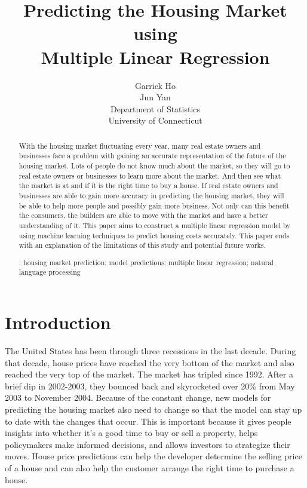 \documentclass[12pt]{article}
\title{Predicting the Housing Market using \\  Multiple Linear Regression}
\author{Garrick Ho\\
  Jun Yan\\[1ex]
  Department of Statistics\\
  University of Connecticut\\
}
\begin{document}
\maketitle
\doublespace

\begin{abstract}
With the housing market fluctuating every year, many real estate owners and businesses face a problem with gaining an accurate representation of the future of the housing market. Lots of people do not know much about the market, so they will go to real estate owners or businesses to learn more about the market. And then see what the market is at and if it is the right time to buy a house. If real estate owners and businesses are able to gain more accuracy in predicting the housing market, they will be able to help more people and possibly gain more business. Not only can this benefit the consumers, the builders are able to move with the market and have a better understanding of it. This paper aims to construct a multiple linear regression model by using machine learning techniques to predict housing costs accurately. This paper ends with an explanation of the limitations of this study and potential future works.

\bigskip
{}:
housing market prediction;
model predictions;
multiple linear regression;
natural language processing


\end{abstract}

\section{Introduction}
\label{sec:intro}


The United States has been through three recessions in the last decade. During that decade, house prices have reached the very bottom of the market and also reached the very top of the market. The market has tripled since 1992. After a brief dip in 2002-2003, they bounced back and skyrocketed over 20\% from May 2003 to November 2004. \cite{Jacobsen2005} Because of the constant change, new models for predicting the housing market also need to change so that the model can stay up to date with the changes that occur. This is important because it gives people insights into whether it's a good time to buy or sell a property, helps policymakers make informed decisions, and allows investors to strategize their moves. House price predictions can help the developer determine the selling price of a house and can also help the customer arrange the right time to purchase a house. \cite{alfiyantin2017} 
\end{document}

